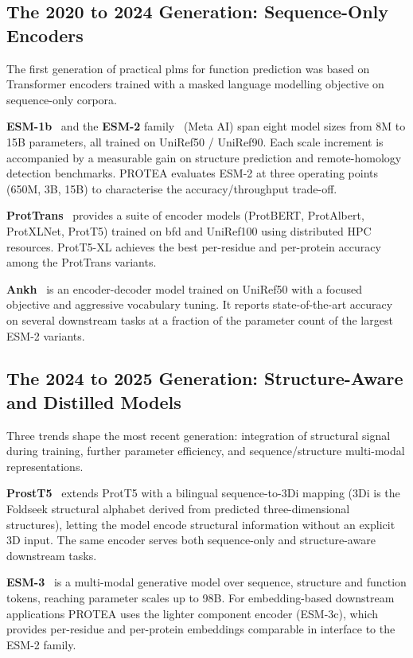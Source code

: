 \subsection{The 2020 to 2024 Generation: Sequence-Only Encoders}
\label{subsec:plm-seq}

The first generation of practical \glspl{plm} for function prediction was based
on Transformer encoders trained with a masked language modelling objective on
sequence-only corpora.

\textbf{ESM-1b}~\cite{rives2021esm1b} and the \textbf{ESM-2}
family~\cite{lin2023esm2} (Meta AI) span eight model sizes from 8M to 15B
parameters, all trained on UniRef50 / UniRef90. Each scale increment is
accompanied by a measurable gain on structure prediction and remote-homology
detection benchmarks. PROTEA evaluates ESM-2 at three operating points (650M,
3B, 15B) to characterise the accuracy/throughput trade-off.

\textbf{ProtTrans}~\cite{elnaggar2022prottrans} provides a suite of encoder
models (ProtBERT, ProtAlbert, ProtXLNet, ProtT5) trained on \gls{bfd} and
UniRef100 using distributed HPC resources. ProtT5-XL achieves the best
per-residue and per-protein accuracy among the ProtTrans variants.

\textbf{Ankh}~\cite{elnaggar2023ankh} is an encoder-decoder model trained on
UniRef50 with a focused objective and aggressive vocabulary tuning. It reports
state-of-the-art accuracy on several downstream tasks at a fraction of the
parameter count of the largest ESM-2 variants.

\subsection{The 2024 to 2025 Generation: Structure-Aware and Distilled Models}
\label{subsec:plm-modern}

Three trends shape the most recent generation: integration of structural
signal during training, further parameter efficiency, and sequence/structure
multi-modal representations.

\textbf{ProstT5}~\cite{heinzinger2023prostt5} extends ProtT5 with a bilingual
sequence-to-3Di mapping (3Di is the Foldseek structural alphabet derived from
predicted three-dimensional structures), letting the model encode structural
information without an explicit 3D input. The same encoder serves both
sequence-only and structure-aware downstream tasks.

\textbf{ESM-3}~\cite{hayes2024esm3} is a multi-modal generative model over
sequence, structure and function tokens, reaching parameter scales up to 98B.
For embedding-based downstream applications PROTEA uses the lighter component
encoder (ESM-3c), which provides per-residue and per-protein embeddings
comparable in interface to the ESM-2 family.

